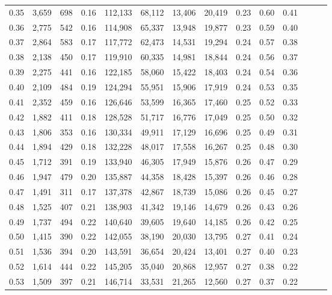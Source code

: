 \begin{tabular}{rrrrrrrrrrrrrr}
0.35 &  3,659 &  698 &  0.16 &  112,133 &   68,112 &  13,406 &  20,419 &  0.23 &  0.60 &      0.41 \\
0.36 &  2,775 &  542 &  0.16 &  114,908 &   65,337 &  13,948 &  19,877 &  0.23 &  0.59 &      0.40 \\
0.37 &  2,864 &  583 &  0.17 &  117,772 &   62,473 &  14,531 &  19,294 &  0.24 &  0.57 &      0.38 \\
0.38 &  2,138 &  450 &  0.17 &  119,910 &   60,335 &  14,981 &  18,844 &  0.24 &  0.56 &      0.37 \\
0.39 &  2,275 &  441 &  0.16 &  122,185 &   58,060 &  15,422 &  18,403 &  0.24 &  0.54 &      0.36 \\
0.40 &  2,109 &  484 &  0.19 &  124,294 &   55,951 &  15,906 &  17,919 &  0.24 &  0.53 &      0.35 \\
0.41 &  2,352 &  459 &  0.16 &  126,646 &   53,599 &  16,365 &  17,460 &  0.25 &  0.52 &      0.33 \\
0.42 &  1,882 &  411 &  0.18 &  128,528 &   51,717 &  16,776 &  17,049 &  0.25 &  0.50 &      0.32 \\
0.43 &  1,806 &  353 &  0.16 &  130,334 &   49,911 &  17,129 &  16,696 &  0.25 &  0.49 &      0.31 \\
0.44 &  1,894 &  429 &  0.18 &  132,228 &   48,017 &  17,558 &  16,267 &  0.25 &  0.48 &      0.30 \\
0.45 &  1,712 &  391 &  0.19 &  133,940 &   46,305 &  17,949 &  15,876 &  0.26 &  0.47 &      0.29 \\
0.46 &  1,947 &  479 &  0.20 &  135,887 &   44,358 &  18,428 &  15,397 &  0.26 &  0.46 &      0.28 \\
0.47 &  1,491 &  311 &  0.17 &  137,378 &   42,867 &  18,739 &  15,086 &  0.26 &  0.45 &      0.27 \\
0.48 &  1,525 &  407 &  0.21 &  138,903 &   41,342 &  19,146 &  14,679 &  0.26 &  0.43 &      0.26 \\
0.49 &  1,737 &  494 &  0.22 &  140,640 &   39,605 &  19,640 &  14,185 &  0.26 &  0.42 &      0.25 \\
0.50 &  1,415 &  390 &  0.22 &  142,055 &   38,190 &  20,030 &  13,795 &  0.27 &  0.41 &      0.24 \\
0.51 &  1,536 &  394 &  0.20 &  143,591 &   36,654 &  20,424 &  13,401 &  0.27 &  0.40 &      0.23 \\
0.52 &  1,614 &  444 &  0.22 &  145,205 &   35,040 &  20,868 &  12,957 &  0.27 &  0.38 &      0.22 \\
0.53 &  1,509 &  397 &  0.21 &  146,714 &   33,531 &  21,265 &  12,560 &  0.27 &  0.37 &      0.22 \\

\end{tabular}
